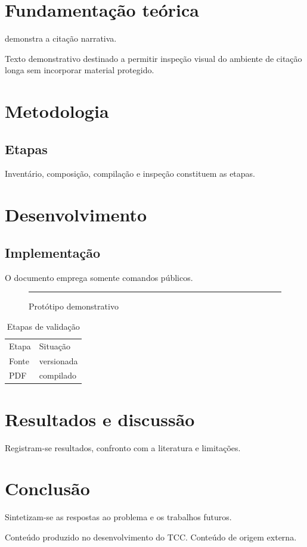 \documentclass[12pt]{report}
\begin{document}
\chapter{Fundamentação teórica}
\textcite{associacao2025} demonstra a citação narrativa.
\begin{ABNTEXcitacaolonga}
Texto demonstrativo destinado a permitir inspeção visual do ambiente de
citação longa sem incorporar material protegido.
\end{ABNTEXcitacaolonga}

\chapter{Metodologia}
\section{Etapas}
Inventário, composição, compilação e inspeção constituem as etapas.

\chapter{Desenvolvimento}
\section{Implementação}
O documento emprega somente comandos públicos.
\begin{figure}[ht]
  \centering
  \rule{0.55\linewidth}{2cm}
  \caption{Protótipo demonstrativo}
\end{figure}
\begin{table}[ht]
  \centering
  \caption{Etapas de validação}
  \begin{tabular}{ll}
    Etapa & Situação\\
    Fonte & versionada\\
    PDF & compilado
  \end{tabular}
\end{table}

\chapter{Resultados e discussão}
Registram-se resultados, confronto com a literatura e limitações.

\chapter{Conclusão}
Sintetizam-se as respostas ao problema e os trabalhos futuros.

\ABNTEXacademicopostextual
\ABNTEXbibliografia
\ABNTEXglossario
{}
Conteúdo produzido no desenvolvimento do TCC.
Conteúdo de origem externa.
\end{document}
